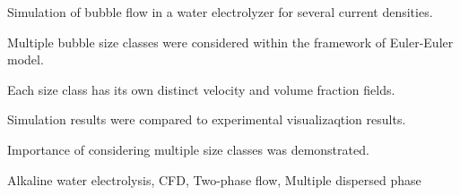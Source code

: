 \documentclass[3p, twocolumn, 10pt]{elsarticle}
\begin{document}
\begin{frontmatter}
\begin{abstract}
Precise description of bubble flow behavior is vital to predict the performance of water electrolysis.
This study employed the Euler-Euler model to simulate bubble flow within an alkaline water electrolysis cell. 
The dispersed gas bubble phase was categorized into three bubble size classes with the representative diameters of 30 (small), 90 (medium), and 270 \si{\micro\metre} (large), where velocity and volume fraction fields were calculated for each class.
Simlations were conducted for three current densities and the results highlighted distinct flow field differences among the three size classes.
This behavior can be attributed to the balance between viscous drag and buoyancy force, which scales with the specific surface area of the bubbles.
The simulation results were compared with experimental visualization in terms of the descending height of bubble circulation along the liquid flow.
Additional simulation with only the medium size class was compared to that with three size classes and the necessity of considering multiple size classes was confirmed.
\end{abstract}


\begin{highlights}
\item Simulation of bubble flow in a water electrolyzer for several current densities.
\item Multiple bubble size classes were considered within the framework of Euler-Euler model.
\item Each size class has its own distinct velocity and volume fraction fields.
\item Simulation results were compared to experimental visualizaqtion results.
\item Importance of considering multiple size classes was demonstrated.
\end{highlights}

\begin{keyword}


Alkaline water electrolysis, CFD, Two-phase flow, Multiple dispersed phase
\end{keyword}

\end{frontmatter}
\end{document}
